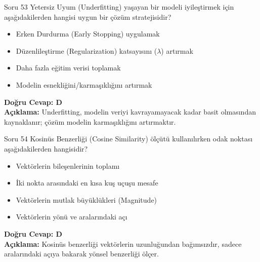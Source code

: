 \documentclass[12pt,a4paper]{article}
\begin{document}
\begin{testcard}{Soru 53}
    Yetersiz Uyum (Underfitting) yaşayan bir modeli iyileştirmek için aşağıdakilerden hangisi uygun bir çözüm stratejisidir?
    \begin{itemize}
        \item[A)] Erken Durdurma (Early Stopping) uygulamak
        \item[B)] Düzenlileştirme (Regularization) katsayısını ($\lambda$) artırmak
        \item[C)] Daha fazla eğitim verisi toplamak
        \item[D)] Modelin esnekliğini/karmaşıklığını artırmak
    \end{itemize}
    \tcblower
    \textbf{Doğru Cevap: D} \\
    \textbf{Açıklama:} Underfitting, modelin veriyi kavrayamayacak kadar basit olmasından kaynaklanır; çözüm modelin karmaşıklığını artırmaktır.
\end{testcard}

\begin{testcard}{Soru 54}
    Kosinüs Benzerliği (Cosine Similarity) ölçütü kullanılırken odak noktası aşağıdakilerden hangisidir?
    \begin{itemize}
        \item[A)] Vektörlerin bileşenlerinin toplamı
        \item[B)] İki nokta arasındaki en kısa kuş uçuşu mesafe
        \item[C)] Vektörlerin mutlak büyüklükleri (Magnitude)
        \item[D)] Vektörlerin yönü ve aralarındaki açı
    \end{itemize}
    \tcblower
    \textbf{Doğru Cevap: D} \\
    \textbf{Açıklama:} Kosinüs benzerliği vektörlerin uzunluğundan bağımsızdır, sadece aralarındaki açıya bakarak yönsel benzerliği ölçer.
\end{testcard}
\end{document}
